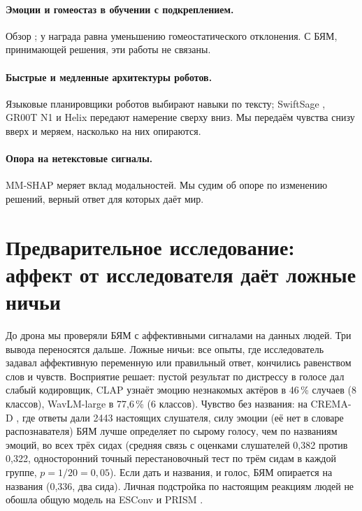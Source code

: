 \documentclass[10pt]{article}
\begin{document}
\paragraph{Эмоции и гомеостаз в обучении с подкреплением.} Обзор \citet{moerland2018}; у \citet{keramati2014} награда равна
уменьшению гомеостатического отклонения. С БЯМ, принимающей решения, эти работы не связаны.
\paragraph{Быстрые и медленные архитектуры роботов.} Языковые планировщики роботов
\citep{ahn2022saycan,vemprala2023chatgpt} выбирают навыки по тексту; SwiftSage \citep{lin2023swiftsage}, GR00T N1 \citep{gr00t2025} и Helix
\citep{helix2025} передают намерение сверху вниз. Мы передаём чувства снизу вверх и меряем, насколько на них опираются.
\paragraph{Опора на нетекстовые сигналы.} MM-SHAP \citep{parcalabescu2023} меряет вклад модальностей. Мы судим об опоре по
изменению решений, верный ответ для которых даёт мир.

\section{Предварительное исследование: аффект от исследователя даёт ложные ничьи}\label{sec:prelim}
До дрона мы проверяли БЯМ с аффективными сигналами на данных людей. Три вывода переносятся дальше. Ложные ничьи: все опыты, где
исследователь задавал аффективную переменную или правильный ответ, кончились равенством слов и чувств. Восприятие решает: пустой
результат по дистрессу в голосе дал слабый кодировщик, CLAP \citep{elizalde2023clap} узнаёт эмоцию незнакомых актёров в 46\,\%
случаев (8 классов), WavLM-large \citep{chen2022wavlm} в 77,6\,\% (6 классов). Чувство без названия: на CREMA-D
\citep{cao2014cremad}, где ответы дали 2443 настоящих слушателя, силу эмоции (её нет в словаре распознавателя) БЯМ лучше
определяет по сырому голосу, чем по названиям эмоций, во всех трёх сидах (средняя связь с оценками слушателей 0,382 против
0,322, односторонний точный перестановочный тест по трём сидам в каждой группе, $p=1/20=0{,}05$). Если дать и названия, и голос, БЯМ опирается на названия (0,336, два сида). Личная
подстройка по настоящим реакциям людей не обошла общую модель на ESConv \citep{liu2021esconv} и PRISM \citep{kirk2024prism}.
\end{document}
